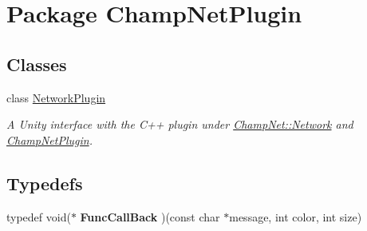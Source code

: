 \hypertarget{namespace_champ_net_plugin}{\section{Package Champ\-Net\-Plugin}
\label{namespace_champ_net_plugin}
}
\subsection*{Classes}
\begin{DoxyCompactItemize}
\item 
class \hyperlink{class_champ_net_plugin_1_1_network_plugin}{Network\-Plugin}
\begin{DoxyCompactList}\small\item\em A Unity interface with the C++ plugin under \hyperlink{class_champ_net_1_1_network}{Champ\-Net\-::\-Network} and \hyperlink{namespace_champ_net_plugin}{Champ\-Net\-Plugin}. \end{DoxyCompactList}\end{DoxyCompactItemize}
\subsection*{Typedefs}
\begin{DoxyCompactItemize}
\item 
\hypertarget{namespace_champ_net_plugin_a95f023a4e052d535ba21ff3bbb13b24c}{typedef void($\ast$ {\bfseries Func\-Call\-Back} )(const char $\ast$message, int color, int size)}\label{namespace_champ_net_plugin_a95f023a4e052d535ba21ff3bbb13b24c}

\end{DoxyCompactItemize}
